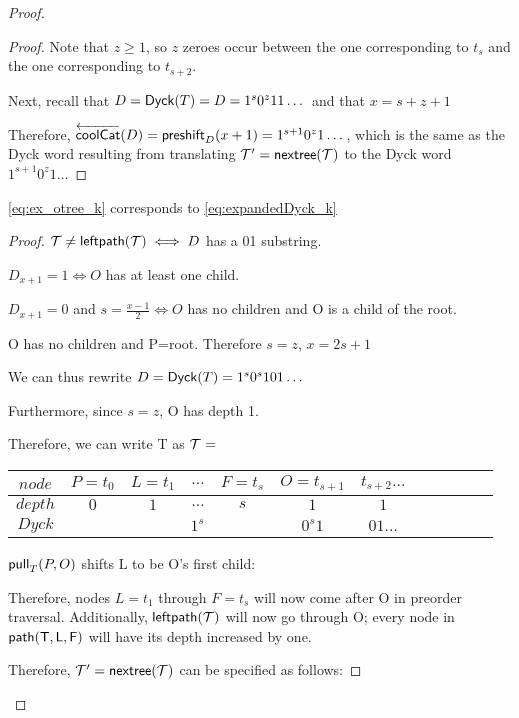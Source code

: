 \begin{proof}
\begin{proof}
    Note that $z \ge 1$, so $z$ zeroes occur between the one corresponding to $t_{s}$ and the one corresponding to $t_{s+2}$.


    Next, recall that $D=\dyck{T}=D=1^s0^z11\dots$ and that $x=s+z+1$

    Therefore, $\coolCat{D}=\preshift{D}{x+1}=1^{s+1}0^z1\dots$, which is the same as the Dyck word resulting from translating $\tree{T}'=\nextTree{T}$ to the Dyck word $1^{s+1}0^z1\dots$

\end{proof}
\begin{lemma}
    \ref{eq:ex_otree_k} corresponds to \ref{eq:expandedDyck_k}
\end{lemma}
\begin{proof}

    $\tree{T} \ne \leftdown{T} \iff D$ has a 01 substring.

    $D_{x+1}=1 \iff O$ has at least one child.

    $D_{x+1}=0$ and $s=\frac{x-1}{2} \iff O$ has no children and O is a child of the root.

    O has no children and P=root. Therefore $s=z$, $x=2s+1$

    We can thus rewrite $D=\dyck{T}=1^s0^s101\dots$

    Furthermore, since $s=z$, O has depth 1. 

    Therefore, we can write T as 
    \noindent $\tree{T}=$
    \begin{center}
	\begin{tabular}{ |c|c|c|c|c|c|c|c|c|c|c|c| } 
	    \hline

	    $node$ & $P=t_0$ & $L=t_1$ & $\dots$ & $F=t_s$ & $O=t_{s+1}$ & $t_{s+2}\dots$ \\
	    \hline
	    $depth$ & $0$ & $1$ & $\dots$ & $s$ & $1$ & $1$ \\
	    \hline
	    $Dyck$ &  &  \multicolumn{3}{|c|}{$1^s$} &  $0^{s}1$   & $01\dots$\\
	    \hline
	\end{tabular}
    \end{center}


    $\poppush[T]{P}{O}$
    shifts L to be O's first child:

    Therefore, nodes $L=t_{1}$ through $F=t_s$ will now come after O in preorder traversal.  Additionally, $\leftdown{T}$ will now go through O; every node in $\path{T}{L}{F}$ will have its depth increased by one.  

    Therefore, $\tree{T}'=\nextTree{T}$ can be specified as follows: 


\end{proof}
\end{proof}
